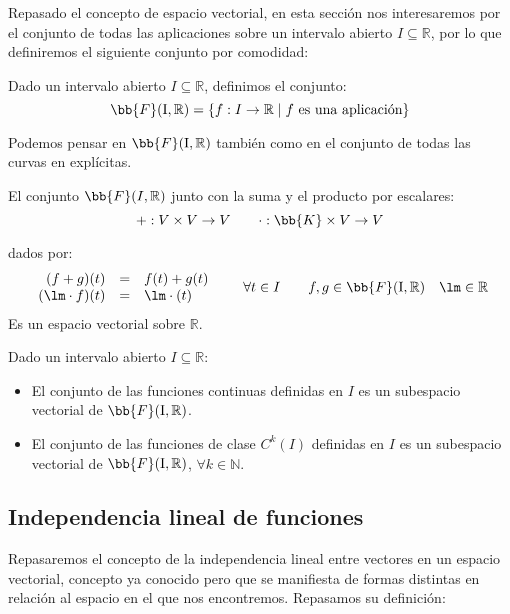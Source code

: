 Repasado el concepto de espacio vectorial, en esta sección nos interesaremos por el conjunto de todas las aplicaciones sobre un intervalo abierto $I\subseteq \mathbb{R}$, por lo que definiremos el siguiente conjunto por comodidad:

\begin{definicion}
    Dado un intervalo abierto $I\subseteq \mathbb{R}$, definimos el conjunto:
    \begin{equation*}
        \bb{F}(\text{I},\mathbb{R}) = \{f:I\rightarrow\mathbb{R} \mid f \text{\ es una aplicación}\}
    \end{equation*}
\end{definicion}
Podemos pensar en $\bb{F}(\text{I}, \mathbb{R})$ también como en el conjunto de todas las curvas en explícitas.

\begin{prop}
    El conjunto $\bb{F}(I,\mathbb{R})$ junto con la suma y el producto por escalares:
    \begin{equation*}
        +:V\times V\rightarrow V \qquad \cdot:\bb{K}\times V\rightarrow V
    \end{equation*}

    dados por:
    \begin{equation*}
        \begin{array}{rcl}
            (f+g)(t) &=& f(t) + g(t) \\
            (\lm \cdot f)(t) &=& \lm \cdot (t)
        \end{array} \qquad \forall t\in I \qquad f,g\in \bb{F}(\text{I},\mathbb{R}) \quad \lm \in \mathbb{R}
    \end{equation*}
    Es un espacio vectorial sobre $\mathbb{R}$.
\end{prop}

\begin{prop}
    Dado un intervalo abierto $I\subseteq \mathbb{R}$:
    \begin{itemize}
        \item El conjunto de las funciones continuas definidas en $I$ es un subespacio vectorial de $\bb{F}(\text{I},\mathbb{R})$.
        \item El conjunto de las funciones de clase $C^k(I)$ definidas en $I$ es un subespacio vectorial de $\bb{F}(\text{I},\mathbb{R})$, $\forall k\in \mathbb{N}$.
    \end{itemize}
\end{prop}

\subsection{Independencia lineal de funciones}
Repasaremos el concepto de la independencia lineal entre vectores en un espacio vectorial, concepto ya conocido pero que se manifiesta de formas distintas en relación al espacio en el que nos encontremos. Repasamos su definición:

